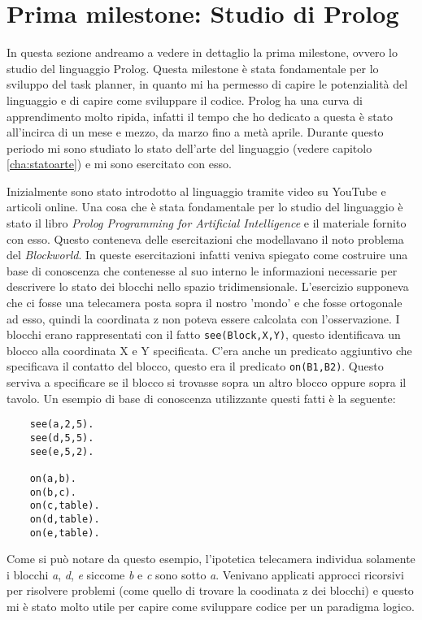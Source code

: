 \section{Prima milestone: Studio di Prolog}
\label{sec:studioprolog}
In questa sezione andreamo a vedere in dettaglio la prima milestone, ovvero lo studio del linguaggio Prolog. Questa milestone è stata fondamentale per lo sviluppo del task planner, in quanto mi ha permesso di capire le potenzialità del linguaggio e di capire come sviluppare il codice.
Prolog ha una curva di apprendimento molto ripida, infatti il tempo che ho dedicato a questa è stato all'incirca di un mese e mezzo, da marzo fino a metà aprile.
Durante questo periodo mi sono studiato lo stato dell'arte del linguaggio (vedere capitolo \ref{cha:statoarte}) e mi sono esercitato con esso.

Inizialmente sono stato introdotto al linguaggio tramite video su YouTube e articoli online. Una cosa che è stata fondamentale per
lo studio del linguaggio è stato il libro \textit{Prolog Programming for Artificial Intelligence} \cite{bratko2001prolog} e il materiale fornito con esso.
Questo conteneva delle esercitazioni che modellavano il noto problema del \textit{Blockworld}. In queste esercitazioni infatti veniva spiegato come costruire una base di conoscenza che contenesse al suo interno
le informazioni necessarie per descrivere lo stato dei blocchi nello spazio tridimensionale. L'esercizio supponeva che ci fosse una telecamera posta sopra il nostro 'mondo' e che fosse ortogonale ad esso, quindi la coordinata z non poteva essere calcolata con l'osservazione.
I blocchi erano rappresentati con il fatto \verb+see(Block,X,Y)+, questo identificava un blocco alla coordinata X e Y specificata.
C'era anche un predicato aggiuntivo che specificava il contatto del blocco, questo era il predicato \verb+on(B1,B2)+. Questo serviva a specificare se il blocco si trovasse sopra un altro blocco oppure sopra il tavolo.
Un esempio di base di conoscenza utilizzante questi fatti è la seguente:
\begin{verbatim}
    see(a,2,5).
    see(d,5,5).
    see(e,5,2).

    on(a,b).
    on(b,c).
    on(c,table).
    on(d,table).
    on(e,table).
\end{verbatim}
Come si può notare da questo esempio, l'ipotetica telecamera individua solamente i blocchi \textit{a}, \textit{d}, \textit{e} siccome  \textit{b} e \textit{c} sono sotto \textit{a}.
Venivano applicati approcci ricorsivi per risolvere problemi (come quello di trovare la coodinata z dei blocchi) e questo mi è stato molto utile per capire come sviluppare codice per un paradigma logico.
